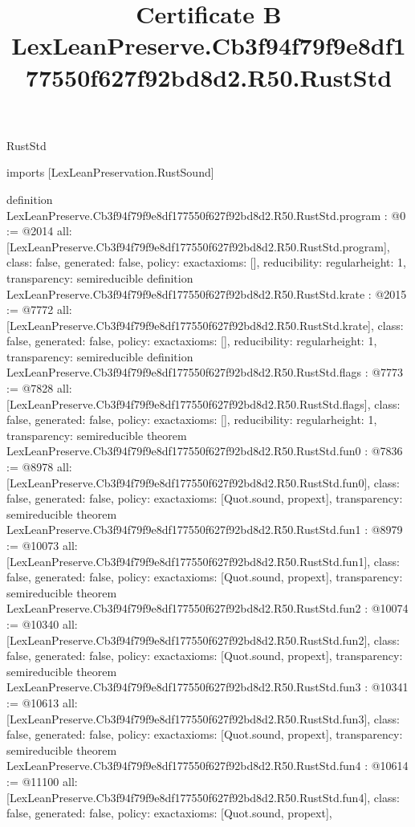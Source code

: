 \begin{lexlean}{RustStd}
\title{Certificate B LexLeanPreserve.Cb3f94f79f9e8df177550f627f92bd8d2.R50.RustStd}
\begin{coremodule}
imports [LexLeanPreservation.RustSound]

definition LexLeanPreserve.Cb3f94f79f9e8df177550f627f92bd8d2.R50.RustStd.program : @0 := @2014 {
  all: [LexLeanPreserve.Cb3f94f79f9e8df177550f627f92bd8d2.R50.RustStd.program],
  class: false,
  generated: false,
  policy: exact{axioms: []},
  reducibility: regular{height: 1},
  transparency: semireducible
}
definition LexLeanPreserve.Cb3f94f79f9e8df177550f627f92bd8d2.R50.RustStd.krate : @2015 := @7772 {
  all: [LexLeanPreserve.Cb3f94f79f9e8df177550f627f92bd8d2.R50.RustStd.krate],
  class: false,
  generated: false,
  policy: exact{axioms: []},
  reducibility: regular{height: 1},
  transparency: semireducible
}
definition LexLeanPreserve.Cb3f94f79f9e8df177550f627f92bd8d2.R50.RustStd.flags : @7773 := @7828 {
  all: [LexLeanPreserve.Cb3f94f79f9e8df177550f627f92bd8d2.R50.RustStd.flags],
  class: false,
  generated: false,
  policy: exact{axioms: []},
  reducibility: regular{height: 1},
  transparency: semireducible
}
theorem LexLeanPreserve.Cb3f94f79f9e8df177550f627f92bd8d2.R50.RustStd.fun0 : @7836 := @8978 {
  all: [LexLeanPreserve.Cb3f94f79f9e8df177550f627f92bd8d2.R50.RustStd.fun0],
  class: false,
  generated: false,
  policy: exact{axioms: [Quot.sound, propext]},
  transparency: semireducible
}
theorem LexLeanPreserve.Cb3f94f79f9e8df177550f627f92bd8d2.R50.RustStd.fun1 : @8979 := @10073 {
  all: [LexLeanPreserve.Cb3f94f79f9e8df177550f627f92bd8d2.R50.RustStd.fun1],
  class: false,
  generated: false,
  policy: exact{axioms: [Quot.sound, propext]},
  transparency: semireducible
}
theorem LexLeanPreserve.Cb3f94f79f9e8df177550f627f92bd8d2.R50.RustStd.fun2 : @10074 := @10340 {
  all: [LexLeanPreserve.Cb3f94f79f9e8df177550f627f92bd8d2.R50.RustStd.fun2],
  class: false,
  generated: false,
  policy: exact{axioms: [Quot.sound, propext]},
  transparency: semireducible
}
theorem LexLeanPreserve.Cb3f94f79f9e8df177550f627f92bd8d2.R50.RustStd.fun3 : @10341 := @10613 {
  all: [LexLeanPreserve.Cb3f94f79f9e8df177550f627f92bd8d2.R50.RustStd.fun3],
  class: false,
  generated: false,
  policy: exact{axioms: [Quot.sound, propext]},
  transparency: semireducible
}
theorem LexLeanPreserve.Cb3f94f79f9e8df177550f627f92bd8d2.R50.RustStd.fun4 : @10614 := @11100 {
  all: [LexLeanPreserve.Cb3f94f79f9e8df177550f627f92bd8d2.R50.RustStd.fun4],
  class: false,
  generated: false,
  policy: exact{axioms: [Quot.sound, propext]},
}
\end{coremodule}
\end{lexlean}
